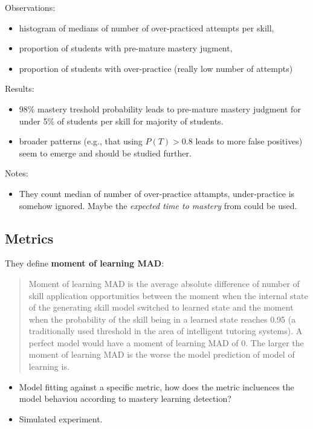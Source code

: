 \documentclass[a4paper]{article}
\begin{document}
Observations:
\begin{itemize}
	\item	histogram of medians of number of over-practiced attempts per skill,
	\item	proportion of students with pre-mature mastery jugment,
	\item	proportion of students with over-practice (really low number of attempts)
\end{itemize}

Results:
\begin{itemize}
	\item	98\% mastery treshold probability leads to pre-mature mastery judgment for
		under 5\% of students per skill for majority of students.
	\item	broader patterns (e.g., that using $P(T) > 0.8$ leads to more false
		positives) seem to emerge and should be studied further.
\end{itemize}

Notes:
\begin{itemize}
	\item	They count median of number of over-practice attampts, under-practice
		is somehow ignored. Maybe the \textit{expected time to mastery} from
		\cite{lee2012impact} could be used.
\end{itemize}

\subsection{Metrics \cite{pardos2013towards}}

They define \textbf{moment of learning MAD}:
\begin{quotation}
Moment of learning MAD is the average absolute difference of number of skill
application opportunities between the moment when the internal state of the
generating skill model switched to learned state and the moment when the
probability of the skill being in a learned state reaches 0.95 (a traditionally
used threshold in the area of intelligent tutoring systems). A perfect model
would have a moment of learning MAD of 0. The larger the moment of learning MAD
is the worse the model prediction of model of learning is.
\end{quotation}

\begin{itemize}
	\item	Model fitting against a specific metric, how does the metric incluences
		the model behaviou according to mastery learning detection?
	\item	Simulated experiment.
\end{itemize}
\end{document}
